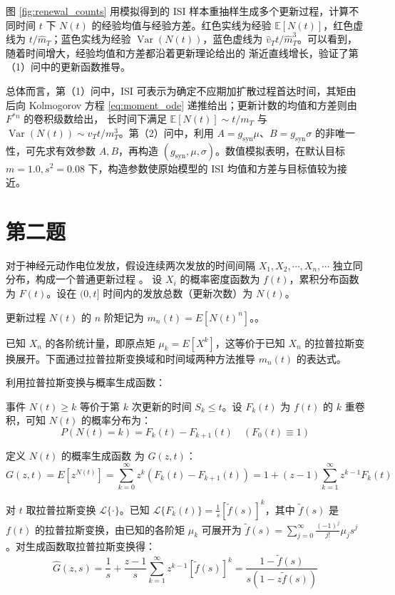 \documentclass[UTF8]{ctexart}
\begin{document}
图 \ref{fig:renewal_counts} 用模拟得到的 ISI 样本重抽样生成多个更新过程，计算不同时间 $t$
下 $N(t)$ 的经验均值与经验方差。红色实线为经验 $\mathbb E[N(t)]$，红色虚线为
$t/\widehat m_T$；蓝色实线为经验 $\operatorname{Var}(N(t))$，蓝色虚线为
$\widehat v_Tt/\widehat m_T^3$。可以看到，随着时间增大，经验均值和方差都沿着更新理论给出的
渐近直线增长，验证了第（1）问中的更新函数推导。



总体而言，第（1）问中，ISI 可表示为确定不应期加扩散过程首达时间，其矩由后向 Kolmogorov 方程
\eqref{eq:moment_ode} 递推给出；更新计数的均值和方差则由 $F^{*n}$ 的卷积级数给出，
长时间下满足 $\mathbb E[N(t)]\sim t/m_T$ 与
$\operatorname{Var}(N(t))\sim v_Tt/m_T^3$。第（2）问中，利用
$A=g_{\mathrm{syn}}\mu$、$B=g_{\mathrm{syn}}\sigma$ 的非唯一性，可先求有效参数
$A,B$，再构造 $(g_{\mathrm{syn}},\mu,\sigma)$。数值模拟表明，在默认目标
$m=1.0,s^2=0.08$ 下，构造参数使原始模型的 ISI 均值和方差与目标值较为接近。






\section{第二题}

对于神经元动作电位发放，假设连续两次发放的时间间隔 $X_1, X_2, \cdots, X_n, \cdots$ 独立同分布，构成一个普通更新过程 。
设 $X_i$ 的概率密度函数为 $f(t)$，累积分布函数为 $F(t)$。设在 $(0, t]$ 时间内的发放总数（更新次数）为 $N(t)$。

更新过程 $N(t)$ 的 $n$ 阶矩记为 $m_n(t) = E[N(t)^n]$。。

已知 $X_n$ 的各阶统计量，即原点矩 $\mu_k = E[X^k]$，这等价于已知 $X_n$ 的拉普拉斯变换展开。下面通过拉普拉斯变换域和时间域两种方法推导 $m_n(t)$ 的表达式。

利用拉普拉斯变换与概率生成函数：

事件 $N(t) \ge k$ 等价于第 $k$ 次更新的时间 $S_k \le t$。设 $F_k(t)$ 为 $f(t)$ 的 $k$ 重卷积，可知 $N(t)$ 的概率分布为：
\begin{equation}
	P(N(t) = k) = F_k(t) - F_{k+1}(t) \quad (F_0(t) \equiv 1)
\end{equation}

定义 $N(t)$ 的概率生成函数 为 $G(z, t)$：
\begin{equation}
	G(z, t) = E[z^{N(t)}] = \sum_{k=0}^{\infty} z^k (F_k(t) - F_{k+1}(t)) = 1 + (z-1) \sum_{k=1}^{\infty} z^{k-1} F_k(t)
\end{equation}

对 $t$ 取拉普拉斯变换 $\mathcal{L}\{\cdot\}$。已知 $\mathcal{L}\{F_k(t)\} = \frac{1}{s} [\tilde{f}(s)]^k$，其中 $\tilde{f}(s)$ 是 $f(t)$ 的拉普拉斯变换，由已知的各阶矩 $\mu_k$ 可展开为 $\tilde{f}(s) = \sum_{j=0}^{\infty} \frac{(-1)^j}{j!} \mu_j s^j$。对生成函数取拉普拉斯变换得：
\begin{equation}
	\hat{G}(z, s) = \frac{1}{s} + \frac{z-1}{s} \sum_{k=1}^{\infty} z^{k-1} [\tilde{f}(s)]^k = \frac{1 - \tilde{f}(s)}{s(1 - z \tilde{f}(s))}
\end{equation}
\end{document}
